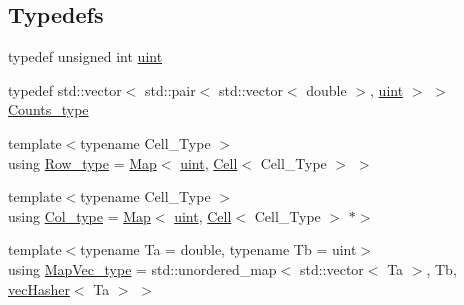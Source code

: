 \subsection*{Typedefs}
\begin{DoxyCompactItemize}
\item 
typedef unsigned int \hyperlink{namespacebarry_a11dfc53ddb4672278319aa04f1e09a6c}{uint}
\item 
typedef std\+::vector$<$ std\+::pair$<$ std\+::vector$<$ double $>$, \hyperlink{namespacebarry_a11dfc53ddb4672278319aa04f1e09a6c}{uint} $>$ $>$ \hyperlink{namespacebarry_a3e2d8c3b6cf602107559d4237d9f1315}{Counts\+\_\+type}
\item 
{\footnotesize template$<$typename Cell\+\_\+\+Type $>$ }\\using \hyperlink{namespacebarry_a741876d7060484e80a9f2b9d128d2c8d}{Row\+\_\+type} = \hyperlink{namespacebarry_a979a04835a9855ff2054c383c569c89e}{Map}$<$ \hyperlink{namespacebarry_a11dfc53ddb4672278319aa04f1e09a6c}{uint}, \hyperlink{classbarry_1_1_cell}{Cell}$<$ Cell\+\_\+\+Type $>$ $>$
\item 
{\footnotesize template$<$typename Cell\+\_\+\+Type $>$ }\\using \hyperlink{namespacebarry_ac328592ccff774bb3614f2cae43cffd7}{Col\+\_\+type} = \hyperlink{namespacebarry_a979a04835a9855ff2054c383c569c89e}{Map}$<$ \hyperlink{namespacebarry_a11dfc53ddb4672278319aa04f1e09a6c}{uint}, \hyperlink{classbarry_1_1_cell}{Cell}$<$ Cell\+\_\+\+Type $>$ $\ast$$>$
\item 
{\footnotesize template$<$typename Ta  = double, typename Tb  = uint$>$ }\\using \hyperlink{namespacebarry_a2f0d3aab1d67e4c8eaeab9022e16139f}{Map\+Vec\+\_\+type} = std\+::unordered\+\_\+map$<$ std\+::vector$<$ Ta $>$, Tb, \hyperlink{structbarry_1_1vec_hasher}{vec\+Hasher}$<$ Ta $>$ $>$
\end{DoxyCompactItemize}
